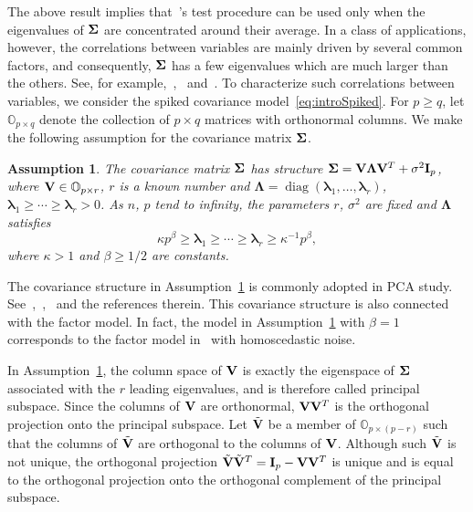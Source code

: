\documentclass[review]{elsarticle}
\DeclareMathOperator{\mydiag}{diag}
\newcommand{\bfsym}[1]{\ensuremath{\boldsymbol{#1}}}
\def\blambda {\bfsym {\lambda}}        \def\bLambda {\bfsym {\Lambda}}
\theoremstyle{plain}
\newtheorem{assumption}{\quad\quad Assumption}
\theoremstyle{definition}
\theoremstyle{remark}
\begin{document}
    The above result implies that~\cite{Chen2010A}'s test procedure can be used only when the eigenvalues of $\bSigma$ are concentrated around their average. 
   In a class of applications, however, the correlations between variables are mainly driven by several common factors, and consequently, $\bSigma$ has a few eigenvalues which are much larger than the others.
    See, for example,~\cite{Jung2009PCA},~\cite{Cai2012Sparse} and~\cite{Fan2015Asymptotics}.
To characterize such correlations between variables, we consider the  spiked covariance model~\eqref{eq:introSpiked}.
For $p\geq q$, let $\mathbb{O}_{p\times q}$ denote the collection of $p\times q$ matrices with orthonormal columns.
We make the following assumption for the covariance matrix $\bSigma$.
\begin{assumption}\label{theModel}
    The covariance matrix $\bSigma$ has structure $ \bSigma=\BV\bLambda \BV^T+\sigma^2 \BI_p$, where $\mathbf{V}\in\mathbb{O}_{p\times r}$, $r$ is a known number and $\bLambda=\mydiag(\blambda_{1},\ldots,\blambda_{r})$, 
 $\blambda_{1}\geq \cdots \geq \blambda_{r}>0$.
As $n$, $p$ tend to infinity, the parameters
$r$, $\sigma^2$ are fixed and $\bLambda$ satisfies     
    \begin{equation*}
        \kappa p^{\beta}\geq \blambda_{1}\geq \cdots \geq\blambda_{r}\geq \kappa^{-1}p^{\beta},
\end{equation*}
where $\kappa>1$ and $\beta\geq {1}/{2}$ are constants.
\end{assumption}

The covariance structure in Assumption~\ref{theModel} is commonly adopted in PCA study.
See~\cite{Cai2012Sparse},~\cite{Birnbaum2013},~\cite{Passemier2015} and the references therein.
This covariance structure is also connected with the factor model.
In fact, the model in Assumption~\ref{theModel} with $\beta=1$
corresponds to the factor model in~\cite{Ma2015A} with homoscedastic noise.

In Assumption~\ref{theModel}, the column space of $\mathbf{V}$ is exactly the eigenspace of $\bSigma$ associated with the $r$ leading eigenvalues, and is therefore called principal subspace. Since the columns of $\mathbf{V}$ are orthonormal, $\mathbf{V} \mathbf{V}^T$ is the orthogonal projection onto the principal subspace.
Let $\tilde{\mathbf{V}}$ be a member of $\mathbb{O}_{p\times (p-r)}$ such that the columns of $\tilde{\mathbf{V}}$ are orthogonal to the columns of  $\mathbf{V}$.
 Although such $\tilde{\mathbf{V}}$ is not unique, the orthogonal projection  $\tilde{\mathbf{V}}\tilde{\mathbf{V}}^T=\mathbf{I}_p-\mathbf{V} \mathbf{V}^T$ is unique and is equal to the orthogonal projection onto the orthogonal complement of the principal subspace.
\end{document}
